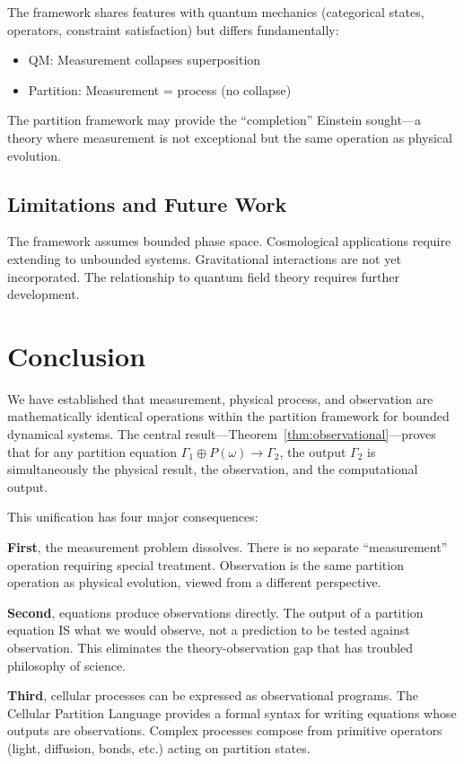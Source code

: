 \documentclass[aps,prd,twocolumn,superscriptaddress,floatfix,nofootinbib]{revtex4-2}
\theoremstyle{remark}
\newcommand{\Pop}{P}
\newcommand{\Gstate}{\Gamma}
\begin{document}
The framework shares features with quantum mechanics (categorical states, operators, constraint satisfaction) but differs fundamentally:
\begin{itemize}
\item QM: Measurement collapses superposition
\item Partition: Measurement = process (no collapse)
\end{itemize}

The partition framework may provide the ``completion'' Einstein sought---a theory where measurement is not exceptional but the same operation as physical evolution.

\subsection{Limitations and Future Work}

The framework assumes bounded phase space. Cosmological applications require extending to unbounded systems. Gravitational interactions are not yet incorporated. The relationship to quantum field theory requires further development.

\section{Conclusion}
\label{sec:conclusion}

We have established that measurement, physical process, and observation are mathematically identical operations within the partition framework for bounded dynamical systems. The central result---Theorem~\ref{thm:observational}---proves that for any partition equation $\Gstate_1 \oplus \Pop(\omega) \to \Gstate_2$, the output $\Gstate_2$ is simultaneously the physical result, the observation, and the computational output.

This unification has four major consequences:

\textbf{First}, the measurement problem dissolves. There is no separate ``measurement'' operation requiring special treatment. Observation is the same partition operation as physical evolution, viewed from a different perspective.

\textbf{Second}, equations produce observations directly. The output of a partition equation IS what we would observe, not a prediction to be tested against observation. This eliminates the theory-observation gap that has troubled philosophy of science.

\textbf{Third}, cellular processes can be expressed as observational programs. The Cellular Partition Language provides a formal syntax for writing equations whose outputs are observations. Complex processes compose from primitive operators (light, diffusion, bonds, etc.) acting on partition states.
\end{document}
